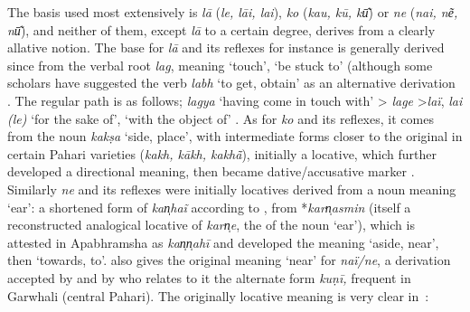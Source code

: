\documentclass[output=paper]{LSP/langsci}
\begin{document}
The basis used most extensively is \textit{lā} (\textit{le, lāi, lai}), \textit{ko} (\textit{kau, kū, kū͂}) or \textit{ne} (\textit{nai, ne͂, nū͂}), and neither of them, except \textit{lā} to a certain degree, derives from a clearly allative notion. The base for \textit{lā} and its reflexes for instance is generally derived since \citet{Beames1970Comparative} from the verbal root \textit{lag}, meaning ‘touch’, ‘be stuck to’ (although some scholars have suggested the verb \textit{labh} ‘to get, obtain’ as an alternative derivation \citep{Tiwari1955Hindi}. The regular path is as follows; \textit{lagya} ‘having come in touch with’ > \textit{lage} >\textit{laï}, \textit{lai (le)} ‘for the sake of’, ‘with the object of’ \citep{Juyal1976Madhya}. As for \textit{ko} and its reflexes, it comes from the  noun \textit{kakṣa} ‘side, place’, with intermediate forms closer to the original in certain Pahari varieties (\textit{kakh, kākh, kakhā̃}), initially a locative, which further developed a directional meaning, then became dative/accusative marker \citep[325]{Strnad2013Morphology}. Similarly \textit{ne} and its reflexes were initially locatives derived from a  noun meaning ‘ear’: a shortened form of \textit{kan̩haĩ} according to \citet{Tessitori1914Notes}, 
from *\textit{karn̩asmin} (itself a reconstructed analogical locative of  \textit{karn̩e}, the  of the noun ‘ear’), which is attested in Apabhramsha as \textit{kan̩n̩ahī} and developed the meaning ‘aside, near’, then ‘towards, to’. \citet[401]{Trumpp1872Grammar} also gives the original meaning ‘near’ for \textit{naï/ne}, a derivation accepted by \citet{Tiwari1955Hindi,Tiwari1966Origin} and by \citet{Chatak1980Madhya} who relates to it the alternate form \textit{kuṇī,} frequent in Garwhali (central Pahari). The originally locative meaning is very clear in~:

\end{document}
